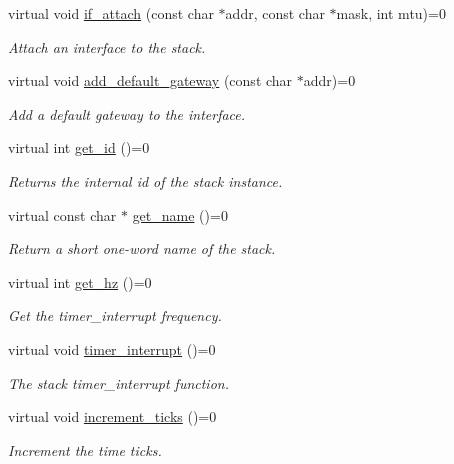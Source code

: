 \begin{DoxyCompactItemize}
virtual void \hyperlink{structINetStack_aa092e60f18b07a756727ef3d48fb23c2}{if\+\_\+attach} (const char $\ast$addr, const char $\ast$mask, int mtu)=0
\begin{DoxyCompactList}\small\item\em Attach an interface to the stack. \end{DoxyCompactList}\item 
virtual void \hyperlink{structINetStack_a73f8126b5bfa498c7558fe3144b79b22}{add\+\_\+default\+\_\+gateway} (const char $\ast$addr)=0
\begin{DoxyCompactList}\small\item\em Add a default gateway to the interface. \end{DoxyCompactList}\item 
virtual int \hyperlink{structINetStack_aa2fa7aa24856935a2141675fd735b5ff}{get\+\_\+id} ()=0
\begin{DoxyCompactList}\small\item\em Returns the internal id of the stack instance. \end{DoxyCompactList}\item 
virtual const char $\ast$ \hyperlink{structINetStack_a665ce57b538c87f2ba7b0f03ca5f89be}{get\+\_\+name} ()=0
\begin{DoxyCompactList}\small\item\em Return a short one-\/word name of the stack. \end{DoxyCompactList}\item 
virtual int \hyperlink{structINetStack_a2e4dceb2e0e63c45a251e84b5a5a380d}{get\+\_\+hz} ()=0
\begin{DoxyCompactList}\small\item\em Get the timer\+\_\+interrupt frequency. \end{DoxyCompactList}\item 
virtual void \hyperlink{structINetStack_adea013a2541f16b8cbf0548744be937b}{timer\+\_\+interrupt} ()=0
\begin{DoxyCompactList}\small\item\em The stack timer\+\_\+interrupt function. \end{DoxyCompactList}\item 
virtual void \hyperlink{structINetStack_a97a74f983e4fd5fddeeff3cf7180a617}{increment\+\_\+ticks} ()=0
\begin{DoxyCompactList}\small\item\em Increment the time ticks. \end{DoxyCompactList}\item 

\end{DoxyCompactItemize}

